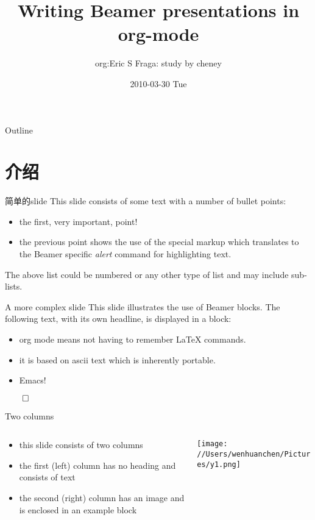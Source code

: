 \documentclass[presentation]{beamer}
\author{org:Eric S Fraga: study by cheney}
\date{2010-03-30 Tue}
\title{Writing Beamer presentations in org-mode}
\begin{document}
\maketitle
\begin{frame}{Outline}
\tableofcontents
\end{frame}

\section{介绍}
\label{sec-1}
\begin{frame}[label=sec-1-1]{简单的slide}
This slide consists of some text with a number of bullet points:

\begin{itemize}
\item the first, very \alert{important}, point!
\item the previous point shows the use of the special markup which
translates to the Beamer specific \emph{alert} command for highlighting
text.
\end{itemize}


The above list could be numbered or any other type of list and may
include sub-lists.
\end{frame}

\begin{frame}[label=sec-1-2]{A more complex slide}
This slide illustrates the use of Beamer blocks.  The following text,
with its own headline, is displayed in a block:


\begin{theorem}
\begin{itemize}
\item org mode means not having to remember \LaTeX{} commands.
\item it is based on ascii text which is inherently portable.
\item Emacs!
\end{itemize}
\hfill \(\qed\)
\end{theorem}
\end{frame}

\begin{frame}[label=sec-1-3]{Two columns}
\begin{columns}
\begin{column}{0.4\textwidth}
\begin{itemize}
\item this slide consists of two columns
\item the first (left) column has no heading and consists of text
\item the second (right) column has an image and is enclosed in an
\alert{example} block
\end{itemize}
\end{column}

\begin{column}{0.6\textwidth}
\texttt{[image: //Users/wenhuanchen/Pictures/y1.png]}
\end{column}
\end{columns}
\end{frame}
\end{document}
